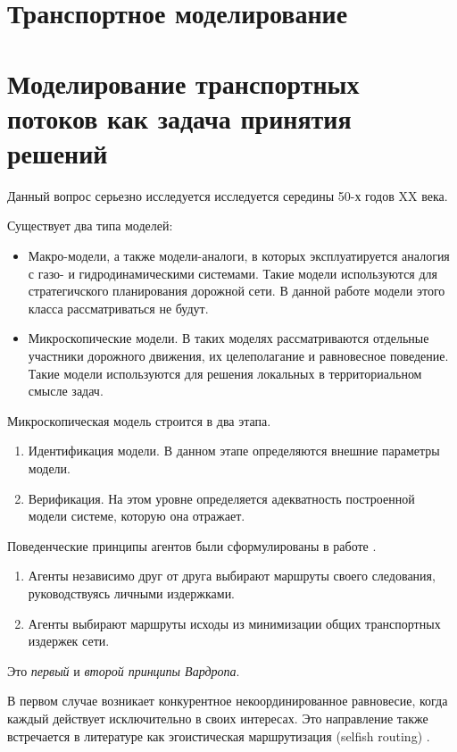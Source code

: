 \section{Транспортное моделирование}
\section{Моделирование транспортных потоков как задача принятия решений}
 
Данный вопрос серьезно исследуется исследуется середины 50-х годов XX века.
 
Существует два типа моделей:
\begin{itemize}
\item Макро-модели, а также модели-аналоги, в которых эксплуатируется
аналогия с газо- и гидродинамическими системами. Такие модели используются
для стратегичского планирования дорожной сети. В данной работе модели этого
класса рассматриваться не будут.
\item Микроскопические модели. В таких моделях рассматриваются отдельные
участники дорожного движения, их целеполагание и равновесное поведение. Такие
модели используются для решения локальных в территориальном смысле задач.
\end{itemize} \cite[225]{gas}
 
Микроскопическая модель строится в два этапа.
 
\begin{enumerate}
	\item Идентификация модели. В данном этапе определяются внешние параметры модели.
	\item Верификация. На этом уровне определяется адекватность построенной модели системе, которую она отражает.
\end{enumerate} \cite[225-226]{gas}

Поведенческие принципы агентов были сформулированы в работе \cite{wardrop}.



\begin{enumerate}
	\item Агенты независимо друг от друга выбирают маршруты своего следования, руководствуясь личными издержками.
	\item Агенты выбирают маршруты исходы из минимизации общих транспортных издержек сети.
\end{enumerate}

Это \textit{первый} и \textit{второй принципы Вардропа}.

В первом случае возникает конкурентное некоординированное равновесие, когда каждый действует исключительно в своих интересах. Это направление также встречается в литературе как эгоистическая маршрутизация (selfish routing) \cite[3]{rough2005}.

